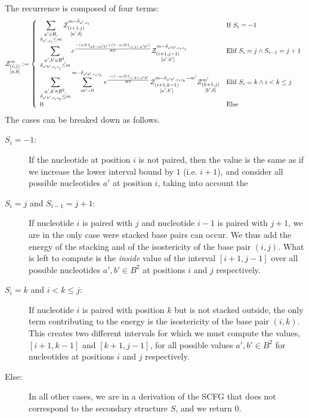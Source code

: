 The recurrence is composed of four terms:
$$
	\Z{i,j}{m}{a,b}:=\left\{
  \begin{array}{ll}
  		\displaystyle
      \sum_{\substack{a'\in \B,\\ \Kron_{a',s_i}\le m}}  
      \Z{i+1,j}{m-\Kron_{a',s_i}}{a',b} & \text{If }S_{i}=-1\\
      \displaystyle
      \sum_{\substack{a',b'\in \B^2,\\ \Kron_{a'b',s_is_j}\le m}}
			 e^{\frac{-(\alpha ES_{a b \to a' b'}+(1-\alpha)EI_{(i,j),a'b'})}{RT}}
			 \Z{i+1,j-1}{m-\Kron_{a'b',s_is_j}}{a',b'}&
			 \text{Elif }S_i=j \land S_{i-1}=j+1\\
			 \displaystyle
      \sum_{\substack{a',b'\in \B^2,\\ \Kron_{a'b',s_is_k}\le m}}
      \sum_{m'=0}^{m-\Kron_{a'b',s_is_k}}
   		 e^{\frac{-(1-\alpha)EI_{(i,k),a'b'}}{RT}}
      \Z{i+1,k-1}{m-\Kron_{a'b',s_is_k}-m'}{a',b'}
      \Z{k+1,j}{m'}{b',b} & \text{Elif }S_i=k \land i < k \leq j\\
      0 &\text{Else}
	\end{array}\right.
$$
The cases can be breaked down as follows.
\begin{description}
\item[$S_{i}=-1$:] If the nucleotide at position $i$ is not paired, then the value is the same
as if we increase the lower interval bound by $1$ (i.e. $i+1$), and consider all possible
 nucleotides $a'$ at position $i$, taking into account the 
\item[$S_i=j$ and $S_{i-1}=j+1$:] If nucleotide $i$ is paired with $j$ and nucleotide $i-1$ is
paired with $j+1$, we are in the only case were stacked base pairs can occur. We thus add
the energy of the stacking and of the isostericity of the base pair $(i,j)$. What is left
to compute is the \emph{inside} value of the interval $[i+1,j-1]$ over all possible nucleotides 
$a',b'\in B^2$ at positions $i$ and $j$ respectively.
\item[$S_i=k$ and $i<k \leq j$:] If nucleotide $i$ is paired with position $k$ but is not stacked outside, the 
only term contributing to the energy is the isostericity of the base pair $(i,k)$. This creates
two different intervals for which we must compute the values, $[i+1,k-1]$ and $[k+1,j-1]$, for 
all possible values $a',b'\in B^2$ for nucleotides at positions $i$ and $j$ respectively.
\item[Else:] In all other cases, we are in a derivation of the SCFG that does not correspond to the 
secondary structure $S$, and we return $0$.

\end{description}

